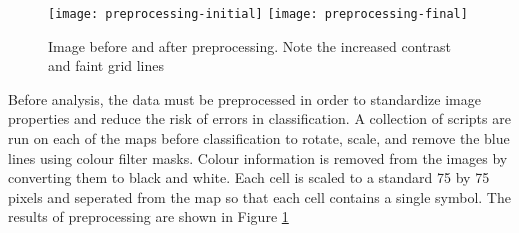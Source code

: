 \begin{figure}[h]
    \begin{center}
    \texttt{[image: preprocessing-initial]}
    \texttt{[image: preprocessing-final]}
    \label{figure:preprocess}
    \caption{Image before and after preprocessing. Note the increased contrast and faint grid lines}
    \end{center}
\end{figure}

Before analysis, the data must be preprocessed in order to standardize image
properties and reduce the risk of errors in classification. A collection of
scripts are run on each of the maps before classification to rotate, scale,
and remove the blue lines using colour filter masks.  Colour information is
removed from the images by converting them to black and white. Each cell is
scaled to a standard 75 by 75 pixels and seperated from the map so that each
cell contains a single symbol.  The results of preprocessing are shown in
Figure \ref{figure:preprocess}

